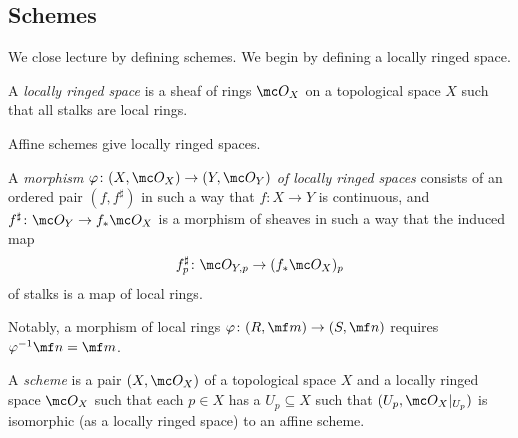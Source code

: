 \documentclass[../notes.tex]{subfiles}
\begin{document}
\subsection{Schemes}
We close lecture by defining schemes. We begin by defining a locally ringed space.
\begin{definition}
	A \textit{locally ringed space} is a sheaf of rings $\mc O_X$ on a topological space $X$ such that all stalks are local rings.
\end{definition}
\begin{example}
	Affine schemes give locally ringed spaces.
\end{example}
\begin{definition}
	A \textit{morphism $\varphi\colon(X,\mc O_X)\to(Y,\mc O_Y)$ of locally ringed spaces} consists of an ordered pair $(f,f^\sharp)$ in such a way that $f\colon X\to Y$ is continuous, and $f^\sharp\colon\mc O_Y\to f_*\mc O_X$ is a morphism of sheaves in such a way that the induced map
	\[f^\sharp_p\colon\mc O_{Y,p}\to(f_*\mc O_X)_p\]
	of stalks is a map of local rings.
\end{definition}
Notably, a morphism of local rings $\varphi\colon(R,\mf m)\to(S,\mf n)$ requires $\varphi^{-1}\mf n=\mf m$.
\begin{definition}[Scheme]
	A \textit{scheme} is a pair $(X,\mc O_X)$ of a topological space $X$ and a locally ringed space $\mc O_X$ such that each $p\in X$ has a $U_p\subseteq X$ such that $(U_p,\mc O_X|_{U_p})$ is isomorphic (as a locally ringed space) to an affine scheme.
\end{definition}
\end{document}
